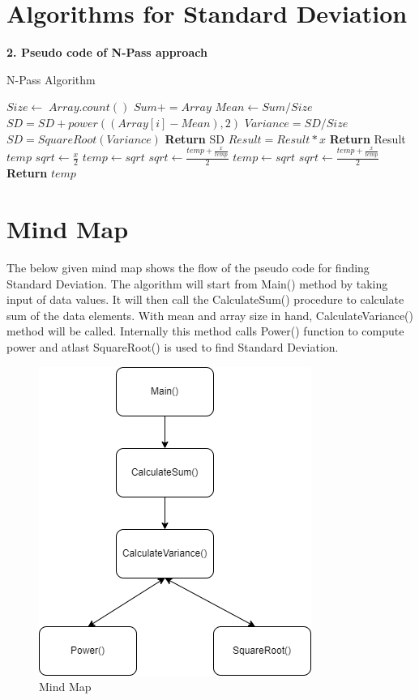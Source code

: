 \documentclass[a4paper, 12pt]{article}
\begin{document}
\newpage
\section*{Algorithms for Standard Deviation}
\textbf{2. Pseudo code of N-Pass approach}\\
\begin{algorithm}
\caption{N-Pass Algorithm}
\begin{algorithmic}[1]

    \State $Size \leftarrow \;Array.count()$
    \State $Sum+=Array$
    \EndFor
    \State $Mean \leftarrow Sum/Size$
    \State $SD=SD+power((Array[i]-Mean),2)$
    \EndFor
    \State $Variance=SD/Size$
    \State $SD=SquareRoot(Variance)$    
    \State \textbf{Return} SD
    \EndProcedure
\Statex
{}
    \State $Result=Result*x$
    \EndFor
    \State \textbf{Return} Result
    \EndProcedure
\Statex
{}
    \State $temp$
    \State $sqrt \leftarrow \frac{x}{2}$
    \State $temp \leftarrow sqrt$
    \State $sqrt \leftarrow \frac{temp +\frac{x}{temp}}{2} $
    \State $temp \leftarrow sqrt$
    \State $sqrt \leftarrow \frac{temp +\frac{x}{temp}}{2} $
    \EndWhile
    \State \textbf{Return} $temp$
    \EndProcedure
\Statex
\end{algorithmic}
\end{algorithm}
\newpage
\section*{Mind Map}
The below given mind map shows the flow of the pseudo code for finding Standard Deviation. The algorithm will start from Main() method by taking input of data values. It will then call the CalculateSum() procedure to calculate sum of the data elements. With mean and array size in hand, CalculateVariance() method will be called. Internally this method calls Power() function to compute power and atlast SquareRoot() is used to find Standard Deviation.\\  
\begin{figure}[h]
    \centering
    \includegraphics{Images/mindmap.png}
    \caption{Mind Map}
    \label{fig:Mind Map Image}
\end{figure}
\newpage
\end{document}
